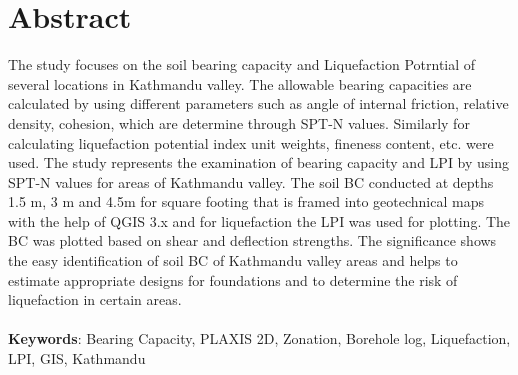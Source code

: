 \chapter*{Abstract}
The study focuses on the soil bearing capacity and Liquefaction Potrntial of several locations in Kathmandu valley.
The allowable bearing capacities are calculated by using different parameters such as angle of internal friction, relative density, cohesion, which are determine through SPT-N values. Similarly for calculating liquefaction potential index unit weights, fineness content, etc. were used.
The study represents the examination of bearing capacity and LPI by using SPT-N values for areas of Kathmandu valley.
The soil BC conducted at depths 1.5 m, 3 m and 4.5m for square footing that is framed into geotechnical maps with the help of QGIS 3.x and for liquefaction the LPI was used for plotting. The BC was plotted based on shear and deflection strengths.
The signiﬁcance shows the easy identiﬁcation of soil BC of Kathmandu valley areas and helps to estimate appropriate designs for foundations and to determine the risk of liquefaction in certain areas. 
\\\\
\textbf{Keywords}: Bearing Capacity, PLAXIS 2D, Zonation, Borehole log, Liquefaction, LPI, GIS, Kathmandu
